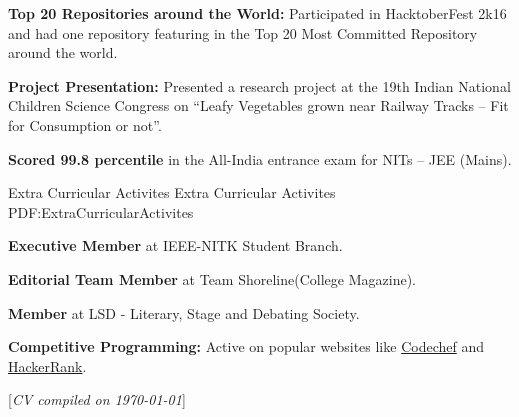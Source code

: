\documentclass[letterpaper,MMMyyyy,nonstopmode]{simpleresumecv}
\newcommand{\CVNote}{CV compiled on {\today}}
\begin{document}
\begin{Body}
\BulletItem
{\textbf{Top 20 Repositories around the World:}}
Participated in HacktoberFest 2k16 and
had one repository featuring in the Top 20 Most Committed Repository around the
world.
\Gap


\BulletItem
{\textbf{Project Presentation: }}
Presented a research project at the 19th Indian National Children Science Congress on “Leafy Vegetables grown near Railway Tracks – Fit for Consumption or not”.
\Gap

\BulletItem
{\textbf{Scored 99.8 percentile }}
in the All-India entrance exam for NITs – JEE (Mains).\Gap


\Section
{Extra Curricular Activites}
{Extra Curricular Activites}
{PDF:ExtraCurricularActivites}

\BulletItem
{\textbf{Executive Member}}
at IEEE-NITK Student Branch.
\Gap

\BulletItem
{\textbf{Editorial Team Member}}
at Team Shoreline(College Magazine).
\Gap

\BulletItem
{\textbf{Member}}
at LSD - Literary, Stage and Debating Society.
\Gap


\BulletItem
{\textbf{Competitive Programming: }}
Active on popular websites like
\href{https://www.codechef.com/users/sbshah}{Codechef} and 
\href{https://www.hackerrank.com/SalmanBhai}{HackerRank}.

\Gap

\end{Body}


\UseNoteFont%
\null\hfill%
[\textit{\CVNote}]
\end{document}
